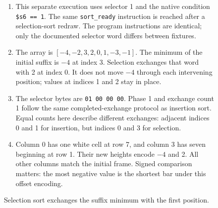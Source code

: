 \begin{figure}[htbp]
  \par\smallskip
  \begin{minipage}{\linewidth}
    \small
    \begin{enumerate}
      \item This separate execution uses selector 1 and the native condition \texttt{\$s6 == 1}. The same \texttt{sort\_ready} instruction is reached after a selection-sort redraw. The program instructions are identical; only the documented selector word differs between fixtures.
      \item The array is $[-4,-2,3,2,0,1,-3,-1]$. The minimum of the initial suffix is $-4$ at index 3. Selection exchanges that word with 2 at index 0. It does not move $-4$ through each intervening position; values at indices 1 and 2 stay in place.
      \item The selector bytes are \texttt{01 00 00 00}. Phase 1 and exchange count 1 follow the same completed-exchange protocol as insertion sort. Equal counts here describe different exchanges: adjacent indices 0 and 1 for insertion, but indices 0 and 3 for selection.
      \item Column 0 has one white cell at row 7, and column 3 has seven beginning at row 1. Their new heights encode $-4$ and 2. All other columns match the initial frame. Signed comparison matters: the most negative value is the shortest bar under this offset encoding.
    \end{enumerate}
  \end{minipage}
  \caption{Selection sort exchanges the suffix minimum with the first position.}
  \label{capture:009-sorting-visualizer-f03-selection}
\end{figure}
\par
